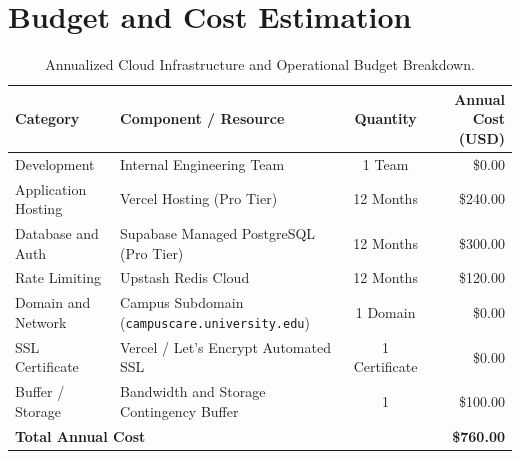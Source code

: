 \documentclass[12pt, a4paper]{article}
\begin{document}
\section{Budget and Cost Estimation}

\begin{table}[H]
\centering
\small
\begin{tabularx}{\textwidth}{p{} X c r}
\toprule
\textbf{Category} & \textbf{Component / Resource} & \textbf{Quantity} & \textbf{Annual Cost (USD)} \\
\midrule
Development & Internal Engineering Team & 1 Team & \$0.00 \\
Application Hosting & Vercel Hosting (Pro Tier) & 12 Months & \$240.00 \\
Database and Auth & Supabase Managed PostgreSQL (Pro Tier) & 12 Months & \$300.00 \\
Rate Limiting & Upstash Redis Cloud & 12 Months & \$120.00 \\
Domain and Network & Campus Subdomain (\texttt{campuscare.\allowbreak university.edu}) & 1 Domain & \$0.00 \\
SSL Certificate & Vercel / Let's Encrypt Automated SSL & 1 Certificate & \$0.00 \\
Buffer / Storage & Bandwidth and Storage Contingency Buffer & 1 & \$100.00 \\
\midrule
\multicolumn{3}{l}{\textbf{Total Annual Cost}} & \textbf{\$760.00} \\
\bottomrule
\end{tabularx}
\caption{Annualized Cloud Infrastructure and Operational Budget Breakdown.}
\end{table}
\end{document}
